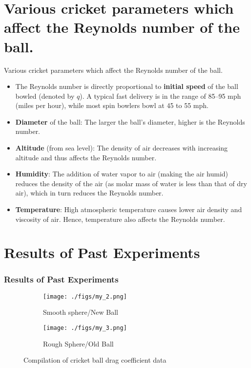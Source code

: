 \documentclass{beamer}
\begin{document}
\section{Various cricket parameters which affect the Reynolds number of the ball.}
\begin{frame}{Various cricket parameters which affect the Reynolds number of the ball.}
    \begin{itemize}
    \item 
    The Reynolds number is directly proportional to \textbf{initial speed} of the ball bowled (denoted by $q$). A typical fast delivery is in the range of 85–95 mph (miles per hour), while most spin bowlers bowl at 45 to 55 mph.
     \item
    \textbf{Diameter} of the ball: The larger the ball's diameter, higher is the Reynolds number.
    \item 
    \textbf{Altitude} (from sea level): The density of air decreases with increasing altitude and thus affects the Reynolds number.
    \item
    \textbf{Humidity}: The addition of water vapor to air (making the air humid) reduces the density of the air (as molar mass of water is less than that of dry air), which in turn reduces the Reynolds number. 
    \item
    \textbf{Temperature}: High atmospheric temperature causes lower air density and  viscosity of air. Hence, temperature also affects the Reynolds number.
  \end{itemize}
\end{frame}


\section{Results of Past Experiments}
\begin{frame}
\frametitle{Results of Past Experiments}

\begin{figure}[h!]
  \centering
  \begin{subfigure}[b]{0.4\linewidth}
    \texttt{[image: ./figs/my\_2.png]}
    \caption{Smooth sphere/New Ball}
  \end{subfigure}
  \begin{subfigure}[b]{0.4\linewidth}
    \texttt{[image: ./figs/my\_3.png]}
    \caption{Rough Sphere/Old Ball}
  \end{subfigure}
  \caption{Compilation of cricket ball drag coefficient data}
  \label{fig:drag1}
\end{figure}
\end{frame}
\end{document}
